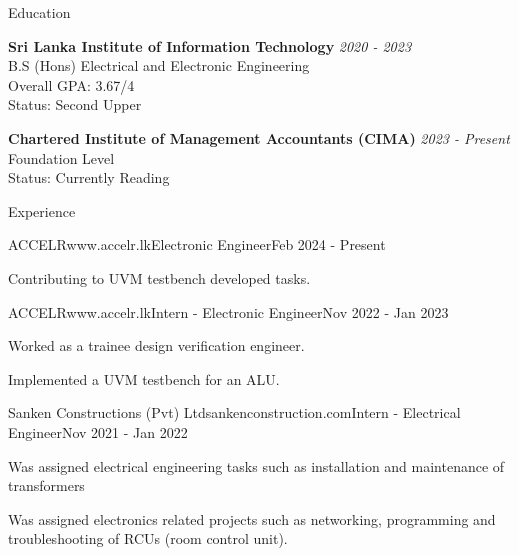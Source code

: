 \documentclass[
	11pt, %
]{./assets/resume} %
\begin{document}

\begin{rSection}{Education}

	\textbf{Sri Lanka Institute of Information Technology} \hfill \textit{2020 - 2023} \\ 
	B.S (Hons) Electrical and Electronic Engineering \\
	Overall GPA: 3.67/4 \\
	Status: Second Upper

	\textbf{Chartered Institute of Management Accountants (CIMA)} \hfill \textit{2023 - Present} \\ 
	Foundation Level \\
	Status: Currently Reading
	
\end{rSection}


\begin{rSection}{Experience}

	\begin{rSubsectionX}{ACCELR}{www.accelr.lk}{Electronic Engineer}{Feb 2024 - Present}
		\item Contributing to UVM testbench developed tasks.
	\end{rSubsectionX}

	\begin{rSubsectionX}{ACCELR}{www.accelr.lk}{Intern - Electronic Engineer}{Nov 2022 - Jan 2023}
		\item Worked as a trainee design verification engineer.
		\item Implemented a UVM testbench for an ALU.
	\end{rSubsectionX}

	\begin{rSubsectionX}{Sanken Constructions (Pvt) Ltd}{sankenconstruction.com}{Intern - Electrical Engineer}{Nov 2021 - Jan 2022}
		\item Was assigned electrical engineering tasks such as installation and maintenance of transformers
		\item Was assigned electronics related projects such as networking, programming and troubleshooting of RCUs (room control unit).
	\end{rSubsectionX}

\end{rSection}
\end{document}
